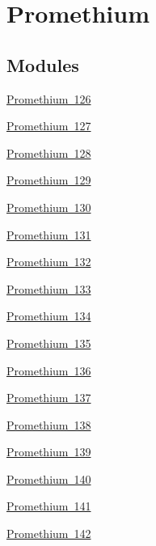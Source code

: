 \hypertarget{group___isotope_const-_promethium}{}\section{Promethium}
\label{group___isotope_const-_promethium}
\subsection*{Modules}
\begin{DoxyCompactItemize}
\item 
\mbox{\hyperlink{group___isotope_const-_promethium-_pm126}{Promethium 126}}
\item 
\mbox{\hyperlink{group___isotope_const-_promethium-_pm127}{Promethium 127}}
\item 
\mbox{\hyperlink{group___isotope_const-_promethium-_pm128}{Promethium 128}}
\item 
\mbox{\hyperlink{group___isotope_const-_promethium-_pm129}{Promethium 129}}
\item 
\mbox{\hyperlink{group___isotope_const-_promethium-_pm130}{Promethium 130}}
\item 
\mbox{\hyperlink{group___isotope_const-_promethium-_pm131}{Promethium 131}}
\item 
\mbox{\hyperlink{group___isotope_const-_promethium-_pm132}{Promethium 132}}
\item 
\mbox{\hyperlink{group___isotope_const-_promethium-_pm133}{Promethium 133}}
\item 
\mbox{\hyperlink{group___isotope_const-_promethium-_pm134}{Promethium 134}}
\item 
\mbox{\hyperlink{group___isotope_const-_promethium-_pm135}{Promethium 135}}
\item 
\mbox{\hyperlink{group___isotope_const-_promethium-_pm136}{Promethium 136}}
\item 
\mbox{\hyperlink{group___isotope_const-_promethium-_pm137}{Promethium 137}}
\item 
\mbox{\hyperlink{group___isotope_const-_promethium-_pm138}{Promethium 138}}
\item 
\mbox{\hyperlink{group___isotope_const-_promethium-_pm139}{Promethium 139}}
\item 
\mbox{\hyperlink{group___isotope_const-_promethium-_pm140}{Promethium 140}}
\item 
\mbox{\hyperlink{group___isotope_const-_promethium-_pm141}{Promethium 141}}
\item 
\mbox{\hyperlink{group___isotope_const-_promethium-_pm142}{Promethium 142}}

\end{DoxyCompactItemize}
